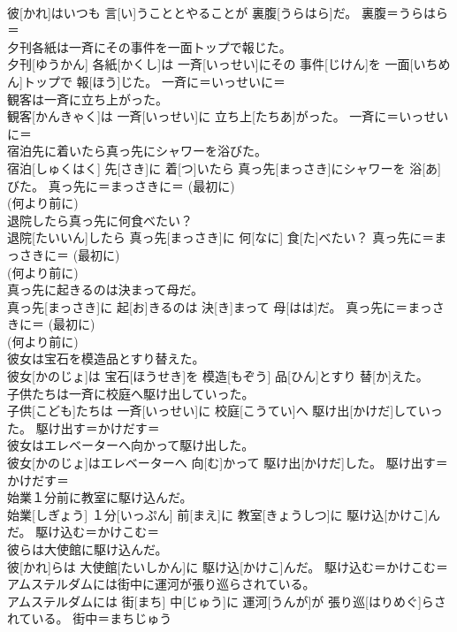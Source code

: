 \documentclass[8pt]{extreport}
\begin{document}
\begin{CJK}{UTF8}{min}
{\\	彼[かれ]はいつも 言[い]うこととやることが 裏腹[うらはら]だ。	裏腹＝うらはら＝ 
\\	夕刊各紙は一斉にその事件を一面トップで報じた。	
\\	夕刊[ゆうかん] 各紙[かくし]は 一斉[いっせい]にその 事件[じけん]を 一面[いちめん]トップで 報[ほう]じた。	一斉に＝いっせいに＝ 
\\	観客は一斉に立ち上がった。	
\\	観客[かんきゃく]は 一斉[いっせい]に 立ち上[たちあ]がった。	一斉に＝いっせいに＝ 
\\	宿泊先に着いたら真っ先にシャワーを浴びた。	
\\	宿泊[しゅくはく] 先[さき]に 着[つ]いたら 真っ先[まっさき]にシャワーを 浴[あ]びた。	真っ先に＝まっさきに＝ (最初に) 
\\	(何より前に) 
\\	退院したら真っ先に何食べたい？	
\\	退院[たいいん]したら 真っ先[まっさき]に 何[なに] 食[た]べたい？	真っ先に＝まっさきに＝ (最初に) 
\\	(何より前に) 
\\	真っ先に起きるのは決まって母だ。	
\\	真っ先[まっさき]に 起[お]きるのは 決[き]まって 母[はは]だ。	真っ先に＝まっさきに＝ (最初に) 
\\	(何より前に) 
\\	彼女は宝石を模造品とすり替えた。	
\\	彼女[かのじょ]は 宝石[ほうせき]を 模造[もぞう] 品[ひん]とすり 替[か]えた。	
\\	子供たちは一斉に校庭へ駆け出していった。	
\\	子供[こども]たちは 一斉[いっせい]に 校庭[こうてい]へ 駆け出[かけだ]していった。	駆け出す＝かけだす＝ 
\\	彼女はエレベーターへ向かって駆け出した。	
\\	彼女[かのじょ]はエレベーターへ 向[む]かって 駆け出[かけだ]した。	駆け出す＝かけだす＝ 
\\	始業１分前に教室に駆け込んだ。	
\\	始業[しぎょう] １分[いっぷん] 前[まえ]に 教室[きょうしつ]に 駆け込[かけこ]んだ。	駆け込む＝かけこむ＝ 
\\	彼らは大使館に駆け込んだ。	
\\	彼[かれ]らは 大使館[たいしかん]に 駆け込[かけこ]んだ。	駆け込む＝かけこむ＝ 
\\	アムステルダムには街中に運河が張り巡らされている。	
\\	アムステルダムには 街[まち] 中[じゅう]に 運河[うんが]が 張り巡[はりめぐ]らされている。	街中＝まちじゅう
}
\end{CJK}
\end{document}
